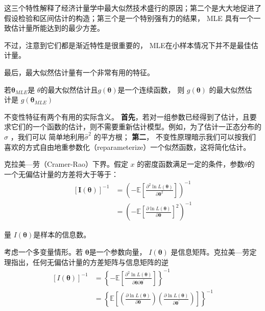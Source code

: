 这三个特性解释了经济计量学中最大似然技术盛行的原因；第二个是大大地促进了假设检验和区间估计的构造；第三个是一个特别强有力的结果， MLE 具有一个一致估计量所能达到的最少方差。

不过，注意到它们都是渐近特性是很重要的， MLE在小样本情况下并不是最佳估计量。

最后，最大似然估计量有一个非常有用的特征。

\begin{theorem}[不变性]
    若$ \boldsymbol{\theta}_{MLE} $是 $ \theta $的最大似然估计且$ g (\boldsymbol{\theta}) $是一个连续函数，
    则 $ g (\boldsymbol{\theta}) $ 的最大似然估 计是 $g( \boldsymbol{\theta}_{MLE}  )$
\end{theorem}

不变性特征有两个有用的实际含义。 {\bf 首先}，若对一组参数已经得到了估计，且要求它们的一个函数的估计，则不需要重新估计模型。例如，为了估计一正态分布的 $ \sigma $ ，我们可以
简单地利用$ \hat{\sigma}^{2} $ 的平方根； {\bf 第二}， 不变性原理暗示我们可以按我们喜欢的方式自由地重参数化（reparameterize）一个似然函数，这将简化估计。

克拉美—劳（Cramer-Rao）下界。假定 $ x $ 的密度函数满足一定的条件，参数$ \theta $的一个无偏估计量的方差将大于等于：
$$ \begin{aligned}
        [\boldsymbol{I(\theta)}]^{-1} & = \left(-\mathbb{E}\left[\frac{\partial^{2} \ln L(\boldsymbol{\theta})}
        {\partial \boldsymbol{\theta}^{2}}\right]\right)^{-1} \\
        &=\left(-\mathbb{E}\left[\frac{\partial \ln L(\boldsymbol{\theta})}{\partial \boldsymbol{\theta}}\right]^{2}\right)^{-1}
    \end{aligned} $$

    量 $ I(\boldsymbol{\theta}) $是样本的信息数。

    考虑一个多变量情形。若 $\boldsymbol{\theta}$是一个参数向量， $ I(\boldsymbol{\theta}) $ 是信息矩阵。克拉美—劳定理指出，任何无偏估计量的方差矩阵与信息矩阵的逆
$$  \begin{aligned}
        [I(\boldsymbol{\theta})]^{-1} & = \left\{-\mathbb{E}  \left[\frac{\partial^{2} \ln L(\boldsymbol{\theta})}
        {\partial \boldsymbol{\theta} \partial \boldsymbol{\theta^{\prime}} }\right]\right\}^{-1}  \\
        & = \left\{\mathbb{E}\left[\left(\frac{\partial \ln L(\boldsymbol{\theta})}{\partial \boldsymbol{\theta}}\right)
         \left(\frac{\partial \ln L(\boldsymbol{\theta})}{\partial \boldsymbol{\theta}^{\prime}}\right)\right]\right\}^{-1}
    \end{aligned}  $$

